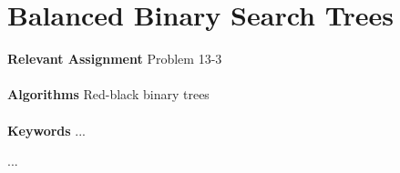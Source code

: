 
\chapter{Balanced Binary Search Trees}
\label{ch:balancedbinarysearchtrees}

\textbf{Relevant Assignment} Problem 13-3\\\\
\textbf{Algorithms} Red-black binary trees\\\\
\textbf{Keywords} ...
\vspace{1in}

\noindent ...

